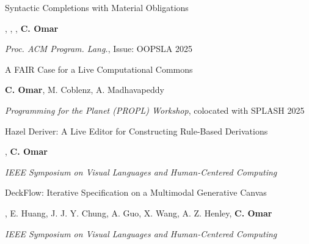 \documentclass[10pt,letterpaper]{article}
\renewenvironment{itemize}{
  \begin{list}{}{
    \setlength{\leftmargin}{1.25em}
    \setlength{\itemsep}{0.25em}
    \setlength{\parskip}{0pt}
    \setlength{\parsep}{0.2em}
  }
}{
  \end{list}
}
\begin{document}
\begin{enumerate}[leftmargin=*, labelindent=6.5em, font=\bfseries]
  \item[OOPSLA 2025] {Syntactic Completions with Material Obligations}
  \begin{itemize}
    \item {}, , , \textbf{C. Omar}
    \item \textit{Proc. ACM Program. Lang.}, Issue: OOPSLA 2025
  \end{itemize}

  \item[PROPL 2025] {A FAIR Case for a Live Computational Commons}
  \begin{itemize}
    \item \textbf{C. Omar}, M. Coblenz, A. Madhavapeddy
    \item \textit{Programming for the Planet (PROPL) Workshop}, colocated with SPLASH 2025
  \end{itemize}

  \item[VL/HCC 2025] {Hazel Deriver: A Live Editor for Constructing Rule-Based Derivations}
  \begin{itemize}
    \item {}, \textbf{C. Omar}
          \item \textit{IEEE Symposium on Visual Languages and Human-Centered Computing}
  \end{itemize}
  \item[VL/HCC 2025] {DeckFlow: Iterative Specification on a Multimodal Generative Canvas}
  \begin{itemize}
    \item {}, {E. Huang}, {J. J. Y. Chung}, A. Guo, X. Wang, A. Z. Henley, \textbf{C. Omar}
          \item \textit{IEEE Symposium on Visual Languages and Human-Centered Computing}
  \end{itemize}


\end{enumerate}
\end{document}
